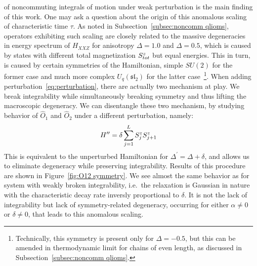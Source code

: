 of noncommuting integrals of motion under weak perturbation is the main finding of this work.
One may ask a question about the origin of this anomalous scaling of characteristic time
\(\tau\). As noted in Subsection~\ref{subsec:noncomm qlioms}, operators exhibiting such scaling
are closely related to the massive degeneracies in energy spectrum of \(H_{XXZ}\) for
anisotropy  \(\Delta=1.0\) and \(\Delta = 0.5\), which is caused by states with
different total magnetization \(S^{z}_{tot}\) but
equal energies. This in turn, is caused by certain symmetries of the Hamiltonian, simple \(SU(2)\) for
the former case and much more complex \(U_q(\mathfrak{sl}_2)\) for the latter 
case~\footnote{Technically, this symmetry is present only for \(\Delta=-0.5\), but this
can be amended in thermodynamic limit for chains of even length, as discussed in 
Subsection~\ref{subsec:noncomm qlioms}. }. 
When adding perturbation~\eqref{eq:perturbation}, there are actually two mechanism at play. We break
integrability while simultaneously breaking symmetry and thus lifting the macroscopic degeneracy.
We can disentangle these two mechanism, by studying behavior of \(\hat{O}_1\) and \(\hat{O}_2\)
under a different perturbation, namely:
\begin{equation}
  H^{\prime\prime} = \delta \sum_{j=1}^{L} S^{z}_j S^{z}_{j+1}
\end{equation}
This is equivalent to the unperturbed Hamiltonian for \(\Delta^{\prime} = \Delta + \delta\),
and allows us to eliminate degeneracy while preserving integrability. Results of this procedure
are shown in Figure~\ref{fig:O12 symmetry}. We see almost the same behavior as for system
with weakly broken integrability, i.e.\ the relaxation is Gaussian in nature with the
characteristic decay rate inversly proportional to \(\delta\). It is not the lack of
integrability but lack of symmetry-related degeneracy, occurring for either \(\alpha\neq 0\)
or \(\delta\neq 0\), that leads to this anomalous scaling.
